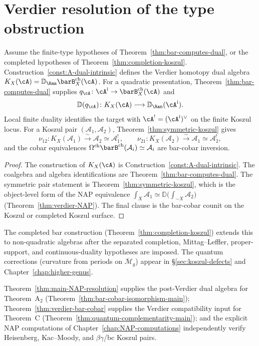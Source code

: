 \section{Verdier resolution of the type obstruction}

\begin{theorem}\label{thm:main-NAP-resolution}
Assume the finite-type hypotheses of
Theorem~\ref{thm:bar-computes-dual}, or the completed hypotheses of
Theorem~\ref{thm:completion-koszul}.
Construction~\ref{const:A-dual-intrinsic} defines the Verdier
homotopy dual algebra
$K_X(\cA)=\mathbb{D}_{\Ran}\barB_X^{\mathrm{ch}}(\cA)$.
For a quadratic presentation,
Theorem~\ref{thm:bar-computes-dual} supplies
$q_\cA\colon\cA^{\mathrm i}\to\barB_X^{\mathrm{ch}}(\cA)$ and
\[
\mathbb D(q_\cA)\colon K_X(\cA)\longrightarrow
\mathbb D_{\Ran}(\cA^{\mathrm i}).
\]
Local finite duality identifies the target with
$\cA^!=(\cA^{\mathrm i})^\vee$ on the finite Koszul locus.
For a Koszul pair $(\mathcal{A}_1,\mathcal{A}_2)$,
Theorem~\ref{thm:symmetric-koszul} gives
\[
\nu_{12}\colon K_X(\mathcal A_1)
\xrightarrow{\sim} \mathcal{A}_2\simeq\mathcal{A}_1^!,
\qquad
\nu_{21}\colon K_X(\mathcal A_2)
\xrightarrow{\sim} \mathcal{A}_1\simeq\mathcal{A}_2^!,
\]
and the cobar equivalences
$\Omega^{\mathrm{ch}}\barB^{\mathrm{ch}}(\mathcal{A}_i)
\simeq\mathcal{A}_i$ are bar-cobar inversion.
\end{theorem}

\begin{proof}
The construction of $K_X(\cA)$ is
Construction~\ref{const:A-dual-intrinsic}. The coalgebra and
algebra identifications are Theorem~\ref{thm:bar-computes-dual}.
The symmetric pair statement is Theorem~\ref{thm:symmetric-koszul},
which is the object-level form of the NAP equivalence
$\int_X \mathcal{A}_1
\simeq \mathbb{D}\bigl(\int_{-X}\mathcal{A}_2\bigr)$
(Theorem~\ref{thm:verdier-NAP}). The final clause is the
bar-cobar counit on the Koszul or completed Koszul surface.
\end{proof}

The completed bar construction (Theorem~\ref{thm:completion-koszul})
extends this to non-quadratic algebras after the separated
completion, Mittag--Leffler, proper-support, and continuous-duality
hypotheses are imposed. The quantum corrections (curvature from
periods on $\overline{\mathcal{M}}_g$) appear in
\S\ref{sec:koszul-defects} and Chapter~\ref{chap:higher-genus}.

\begin{remark}\label{rem:nap-usage}
Theorem~\ref{thm:main-NAP-resolution} supplies the post-Verdier
dual algebra for Theorem~A$_2$
(Theorem~\ref{thm:bar-cobar-isomorphism-main});
Theorem~\ref{thm:verdier-bar-cobar} supplies the Verdier
compatibility input for Theorem~C
(Theorem~\ref{thm:quantum-complementarity-main}); and the
explicit NAP computations of
Chapter~\ref{chap:NAP-computations} independently verify
Heisenberg, Kac--Moody, and $\beta\gamma$/bc Koszul pairs.
\end{remark}

